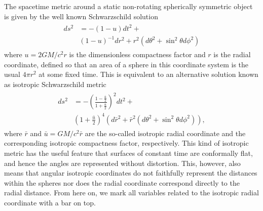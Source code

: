 \documentclass[iop, usenatbib]{emulateapj}
\newcommand{\sch}{Schwarzschild }
\newcommand{\rb}{\ensuremath{\bar{r}}}
\renewcommand{\ub}{\ensuremath{\bar{u}}}
\begin{document}
The spacetime metric around a static non-rotating spherically symmetric object is given by the well known \sch solution
\begin{align}\begin{split}
ds^2 & = -(1-u)dt^2 + \\
     & (1-u)^{-1}dr^2+r^2(d\theta^2+\sin^2\theta d\phi^2)
\end{split}\end{align}
where $u = 2GM/c^2 r$ is the dimensionless compactness factor and $r$ is the radial coordinate, defined so that an area of a sphere in this coordinate system is the usual $4\pi r^2$ at some fixed time.
This is equivalent to an alternative solution known as isotropic \sch metric \citep[see e.g.][]{MTW73}
\begin{align}\begin{split}
\label{eq:ISch}
ds^2 & = -\left( \frac{1-\frac{\ub}{2}}{1+\frac{\ub}{2}} \right)^2 dt^2 + \\
     & (1+\frac{\ub}{2})^4(d\rb^2 + \rb^2(d\theta^2+\sin^2\theta d\phi^2)),
\end{split}\end{align}
where  $\rb$ and $\ub=GM/c^2\rb$ are the so-called isotropic radial
coordinate and the corresponding isotropic compactness factor,
respectively. 
This kind of isotropic metric has the useful feature that surfaces of constant time are conformally flat, and hence the angles are represented without distortion.
This, however, also means that angular isotropic coordinates do not faithfully represent the distances within the spheres nor does the radial coordinate correspond directly to the radial distance.
From here on, we mark all variables related to the isotropic radial coordinate with a bar on top.
\end{document}
